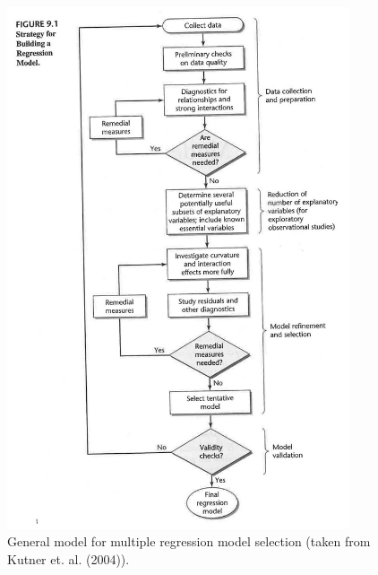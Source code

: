 \documentclass[12pt]{notes}
\begin{document}
\begin{figure}
\centering
\includegraphics[width=0.9\textwidth]{figures/module3/workflow.jpg}
\caption{General model for multiple regression model selection (taken from Kutner et. al. (2004)).}
\label{fig:workflow}
\end{figure}

\end{document}

